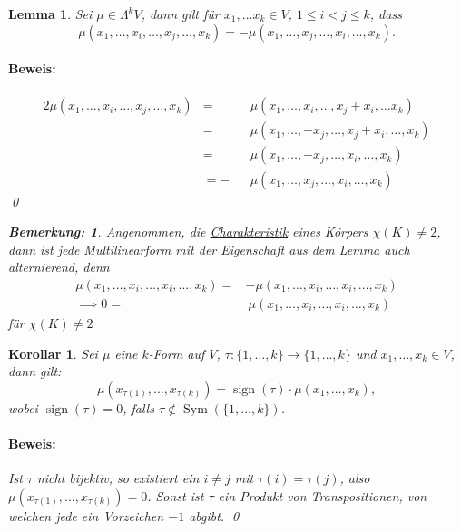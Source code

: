 \documentclass{report}
\DeclareMathOperator{\Sym}{Sym}
\DeclareMathOperator{\sign}{sign}
\theoremstyle{customrem}
\newtheorem*{bemerkung}{Bemerkung\textnormal:}
\theoremstyle{customdef}
\newtheorem{lemma}[definition]{Lemma}
\newtheorem{korrolar}[definition]{Korollar}
\renewenvironment{proof}{\paragraph{Beweis: }}{\qed}
\begin{document}
	\begin{lemma}
		Sei \(\mu\in\Lambda^kV\), dann gilt für \(x_1,\ldots x_k\in V\), \(1\leq i<j\leq k\), dass \[\mu(x_1,\ldots, x_i,\ldots, x_j,\ldots, x_k) = -\mu(x_1,\ldots, x_j,\ldots, x_i,\ldots, x_k).\]
		\begin{proof}
			\begin{alignat*}{2}
				\mu(x_1,\ldots, x_i, \ldots, x_j, \ldots, x_k) 	&=  &&\mu(x_1, \ldots,  x_i, \ldots, x_j+x_i, \ldots x_k)\\
																&=  &&\mu(x_1, \ldots, -x_j, \ldots, x_j+x_i, \ldots, x_k)\\
																&=  &&\mu(x_1, \ldots, -x_j, \ldots, x_i, \ldots, x_k)\\
																&= -&&\mu(x_1, \ldots,  x_j, \ldots, x_i, \ldots, x_k)
			\end{alignat*}
		\end{proof}
		\begin{bemerkung}
			Angenommen, die \hyperref[lem142]{Charakteristik} eines Körpers \(\chi(K)\neq 2\), dann ist jede Multilinearform mit der Eigenschaft aus dem Lemma auch alternierend, denn
			\begin{align*}
				\mu(x_1, \ldots, x_i, \ldots, x_i, \ldots, x_k) =	& -\mu(x_1, \ldots, x_i, \ldots, x_i, \ldots, x_k)\\
														\implies 0=	&\  \mu(x_1, \ldots, x_i, \ldots, x_i, \ldots, x_k)
			\end{align*}
			für \(\chi(K)\neq 2\)
		\end{bemerkung}
	\end{lemma}
	
	\begin{korrolar}
		Sei \(\mu\) eine \(k\)-Form auf \(V\), \(\tau:\{1,\ldots, k\}\to\{1,\ldots, k\}\) und \(x_1,\ldots, x_k\in V\), dann gilt: \[\mu(x_{\tau(1)},\ldots, x_{\tau(k)}) = \sign(\tau)\cdot \mu(x_1,\ldots, x_k), \] wobei \(\sign(\tau)=0\), falls \(\tau\notin\Sym(\{1,\ldots, k\})\).
		\begin{proof}
			Ist \(\tau\) nicht bijektiv, so existiert ein \(i\neq j\) mit \(\tau(i)=\tau(j)\), also \(\mu(x_{\tau(1)},\ldots, x_{\tau(k)}) = 0\). Sonst ist \(\tau\) ein Produkt von Transpositionen, von welchen jede ein Vorzeichen \(-1\) abgibt.
		\end{proof}
	\end{korrolar}
	
\end{document}
